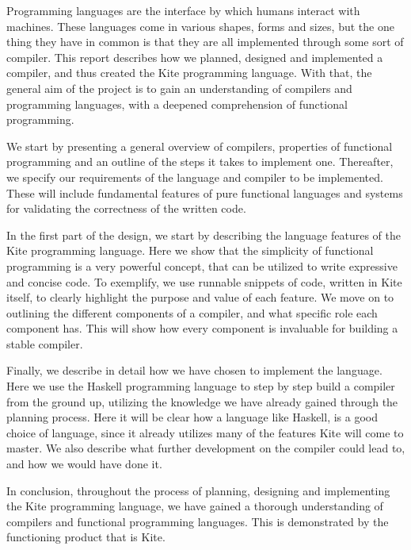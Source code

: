 
Programming languages are the interface by which humans interact with machines. These languages come in various shapes, forms and sizes, but the one thing they have in common is that they are all implemented through some sort of compiler. This report describes how we planned, designed and implemented a compiler, and thus created the Kite programming language. With that, the general aim of the project is to gain an understanding of compilers and programming languages, with a deepened comprehension of functional programming.

We start by presenting a general overview of compilers, properties of functional programming and an outline of the steps it takes to implement one. Thereafter, we specify our requirements of the language and compiler to be implemented. These will include fundamental features of pure functional languages and systems for validating the correctness of the written code.

In the first part of the design, we start by describing the language features of the Kite programming language. Here we show that the simplicity of functional programming is a very powerful concept, that can be utilized to write expressive and concise code. To exemplify, we use runnable snippets of code, written in Kite itself, to clearly highlight the purpose and value of each feature. We move on to outlining the different components of a compiler, and what specific role each component has. This will show how every component is invaluable for building a stable compiler.

Finally, we describe in detail how we have chosen to implement the language. Here we use the Haskell programming language to step by step build a compiler from the ground up, utilizing the knowledge we have already gained through the planning process. Here it will be clear how a language like Haskell, is a good choice of language, since it already utilizes many of the features Kite will come to master. We also describe what further development on the compiler could lead to, and how we would have done it.

In conclusion, throughout the process of planning, designing and implementing the Kite programming language, we have gained a thorough understanding of compilers and functional programming languages. This is demonstrated by the functioning product that is Kite.
